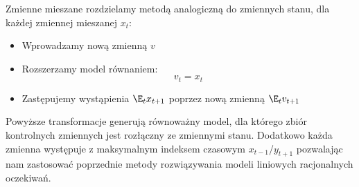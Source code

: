
Zmienne mieszane rozdzielamy metodą analogiczną do zmiennych stanu, dla każdej zmiennej mieszanej $x_t$:
\begin{itemize}
    \item Wprowadzamy nową zmienną $v$
    \item Rozszerzamy model równaniem:
    \begin{equation*}
        v_t = x_t
    \end{equation*}
    \item Zastępujemy wystąpienia $\E_t x_{t+1}$ poprzez nową zmienną $\E_t v_{t+1}$ 
\end{itemize}

Powyższe transformacje generują równoważny model, dla którego zbiór kontrolnych zmiennych jest rozłączny ze zmiennymi stanu. Dodatkowo każda zmienna występuje z maksymalnym indeksem czasowym $x_{t-1}$/$y_{t+1}$ pozwalając nam zastosować poprzednie metody rozwiązywania modeli liniowych racjonalnych oczekiwań.


